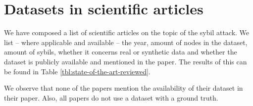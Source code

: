 \section{Datasets in scientific articles}
	\label{sct:datasets_articles}
	
	We have composed a list of scientific articles on the topic of the sybil attack. 
	We list -- where applicable and available -- the year, amount of nodes in the dataset, amount of sybils, whether it concerns real or synthetic data and whether the dataset is publicly available and mentioned in the paper.
	The results of this can be found in Table \ref{tbl:state-of-the-art-reviewed}.
	
	We observe that none of the papers mention the availability of their dataset in their paper. 
	Also, all papers do not use a dataset with a ground truth.